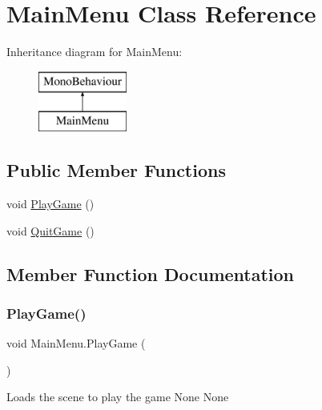 \hypertarget{class_main_menu}{}\section{Main\+Menu Class Reference}
\label{class_main_menu}
Inheritance diagram for Main\+Menu\+:\begin{figure}[H]
\begin{center}
\leavevmode
\includegraphics[height=2.000000cm]{class_main_menu}
\end{center}
\end{figure}
\subsection*{Public Member Functions}
\begin{DoxyCompactItemize}
\item 
void \mbox{\hyperlink{class_main_menu_a11d7e3cd6b90cf59659e03e830e02db5}{Play\+Game}} ()
\item 
void \mbox{\hyperlink{class_main_menu_a485db7cf60c0b93ecc87b9273bcce78b}{Quit\+Game}} ()
\end{DoxyCompactItemize}


\subsection{Member Function Documentation}
\mbox{\label{class_main_menu_a11d7e3cd6b90cf59659e03e830e02db5}} 
\subsubsection{\texorpdfstring{Play\+Game()}{PlayGame()}}
{\footnotesize\ttfamily void Main\+Menu.\+Play\+Game (\begin{DoxyParamCaption}{ }\end{DoxyParamCaption})\hspace{0.3cm}{\ttfamily [inline]}}

Loads the scene to play the game  None  None \mbox{\label{class_main_menu_a485db7cf60c0b93ecc87b9273bcce78b}} 
